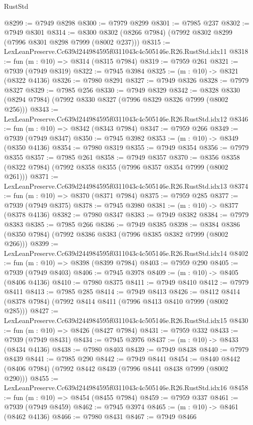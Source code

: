 \begin{lexlean}{RustStd}
\begin{coremodule}
@8299 := @7949 @8298
@8300 := @7979 @8299
@8301 := @7985 @237
@8302 := @7949 @8301
@8314 := @8300 @8302 (@8266 @7984) (@7992 @8302 @8299 (@7996 @8301 @8298 @7999 (@8002 @237)))
@8315 := LexLeanPreserve.Cc639d244984595f0311043c4c505146e.R26.RustStd.idx11
@8318 := fun (m : @10) => @8314 (@8315 @7984)
@8319 := @7959 @261
@8321 := @7939 (@7949 @8319)
@8322 := @7945 @3984
@8325 := (m : @10) -> @8321 (@8322 @4136)
@8326 := @7980 @8291
@8327 := @7949 @8326
@8328 := @7979 @8327
@8329 := @7985 @256
@8330 := @7949 @8329
@8342 := @8328 @8330 (@8294 @7984) (@7992 @8330 @8327 (@7996 @8329 @8326 @7999 (@8002 @256)))
@8343 := LexLeanPreserve.Cc639d244984595f0311043c4c505146e.R26.RustStd.idx12
@8346 := fun (m : @10) => @8342 (@8343 @7984)
@8347 := @7959 @266
@8349 := @7939 (@7949 @8347)
@8350 := @7945 @3982
@8353 := (m : @10) -> @8349 (@8350 @4136)
@8354 := @7980 @8319
@8355 := @7949 @8354
@8356 := @7979 @8355
@8357 := @7985 @261
@8358 := @7949 @8357
@8370 := @8356 @8358 (@8322 @7984) (@7992 @8358 @8355 (@7996 @8357 @8354 @7999 (@8002 @261)))
@8371 := LexLeanPreserve.Cc639d244984595f0311043c4c505146e.R26.RustStd.idx13
@8374 := fun (m : @10) => @8370 (@8371 @7984)
@8375 := @7959 @285
@8377 := @7939 (@7949 @8375)
@8378 := @7945 @3980
@8381 := (m : @10) -> @8377 (@8378 @4136)
@8382 := @7980 @8347
@8383 := @7949 @8382
@8384 := @7979 @8383
@8385 := @7985 @266
@8386 := @7949 @8385
@8398 := @8384 @8386 (@8350 @7984) (@7992 @8386 @8383 (@7996 @8385 @8382 @7999 (@8002 @266)))
@8399 := LexLeanPreserve.Cc639d244984595f0311043c4c505146e.R26.RustStd.idx14
@8402 := fun (m : @10) => @8398 (@8399 @7984)
@8403 := @7959 @290
@8405 := @7939 (@7949 @8403)
@8406 := @7945 @3978
@8409 := (m : @10) -> @8405 (@8406 @4136)
@8410 := @7980 @8375
@8411 := @7949 @8410
@8412 := @7979 @8411
@8413 := @7985 @285
@8414 := @7949 @8413
@8426 := @8412 @8414 (@8378 @7984) (@7992 @8414 @8411 (@7996 @8413 @8410 @7999 (@8002 @285)))
@8427 := LexLeanPreserve.Cc639d244984595f0311043c4c505146e.R26.RustStd.idx15
@8430 := fun (m : @10) => @8426 (@8427 @7984)
@8431 := @7959 @332
@8433 := @7939 (@7949 @8431)
@8434 := @7945 @3976
@8437 := (m : @10) -> @8433 (@8434 @4136)
@8438 := @7980 @8403
@8439 := @7949 @8438
@8440 := @7979 @8439
@8441 := @7985 @290
@8442 := @7949 @8441
@8454 := @8440 @8442 (@8406 @7984) (@7992 @8442 @8439 (@7996 @8441 @8438 @7999 (@8002 @290)))
@8455 := LexLeanPreserve.Cc639d244984595f0311043c4c505146e.R26.RustStd.idx16
@8458 := fun (m : @10) => @8454 (@8455 @7984)
@8459 := @7959 @337
@8461 := @7939 (@7949 @8459)
@8462 := @7945 @3974
@8465 := (m : @10) -> @8461 (@8462 @4136)
@8466 := @7980 @8431
@8467 := @7949 @8466

\end{coremodule}
\end{lexlean}
